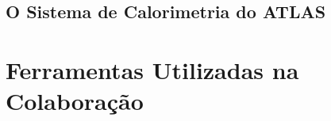 \subsection{O Sistema de Calorimetria do ATLAS}
\label{ssec:calorimetria}


\section{Ferramentas Utilizadas na Colaboração}
\label{sec:ferramentas}


